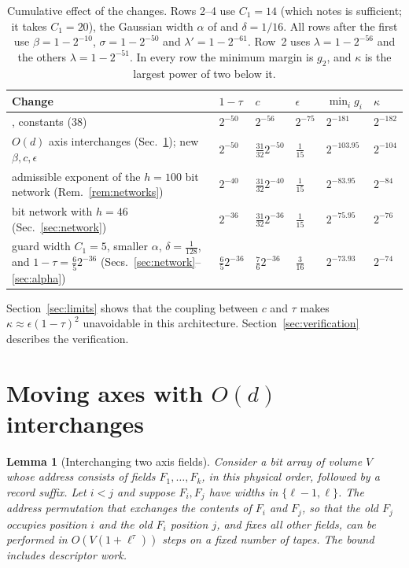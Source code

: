 \documentclass[11pt]{article}
\numberwithin{equation}{section}
\numberwithin{table}{section}
\newtheorem{lemma}[theorem]{Lemma}
\theoremstyle{remark}
\newcommand{\OAI}{\cite{OAI}}
\begin{document}
\begin{table}[ht]
\centering
\small
\renewcommand{\arraystretch}{1.3}
\begin{tabular}{@{}>{\raggedright\arraybackslash}p{.39\linewidth}lllll@{}}
\toprule
Change & $1-\tau$ & $c$ & $\epsilon$ & $\min_i g_i$ & $\kappa$\\
\midrule
\OAI, constants (38) & $2^{-50}$ & $2^{-56}$ & $2^{-75}$ & $2^{-181}$ & $2^{-182}$\\
$O(d)$ axis interchanges (Sec.~\ref{sec:axes}); new $\beta,c,\epsilon$
 & $2^{-50}$ & $\tfrac{31}{32}2^{-50}$ & $\tfrac1{15}$ & $2^{-103.95}$ & $2^{-104}$\\
admissible exponent of the $h=100$ bit network (Rem.~\ref{rem:networks}) & $2^{-40}$ & $\tfrac{31}{32}2^{-40}$ & $\tfrac1{15}$ & $2^{-83.95}$ & $2^{-84}$\\
bit network with $h=46$ (Sec.~\ref{sec:network})
 & $2^{-36}$ & $\tfrac{31}{32}2^{-36}$ & $\tfrac1{15}$ & $2^{-75.95}$ & $2^{-76}$\\
guard width $C_1=5$, smaller $\alpha$, $\delta=\tfrac1{128}$, and $1-\tau=\tfrac65 2^{-36}$ (Secs.~\ref{sec:network}--\ref{sec:alpha})
 & $\tfrac65 2^{-36}$ & $\tfrac76 2^{-36}$ & $\tfrac3{16}$ & $2^{-73.93}$ & $2^{-74}$\\
\bottomrule
\end{tabular}
\caption{Cumulative effect of the changes. Rows 2--4 use
$C_1=14$ (which \OAI{} notes is sufficient; it takes $C_1=20$), the Gaussian width
$\alpha$ of \OAI{} and $\delta=1/16$. All rows after the first use
$\beta=1-2^{-10}$, $\sigma=1-2^{-50}$ and $\lambda'=1-2^{-61}$. Row~2 uses
$\lambda=1-2^{-56}$ and the others $\lambda=1-2^{-51}$. In every row
the minimum margin is $g_2$, and $\kappa$ is the largest power of two
below it.}
\label{tab:ladder}
\end{table}

Section~\ref{sec:limits} shows that the coupling between $c$ and $\tau$
makes $\kappa\approx\epsilon(1-\tau)^2$ unavoidable in this
architecture. Section~\ref{sec:verification} describes the
verification.

\section{Moving axes with \texorpdfstring{$O(d)$}{O(d)} interchanges}
\label{sec:axes}

\begin{lemma}[Interchanging two axis fields]\label{lem:direct-swap}
Consider a bit array of volume $V$ whose address consists of fields
$F_1,\dots,F_k$, in this physical order, followed by a record suffix.
Let $i<j$ and suppose $F_i,F_j$ have widths in $\{\ell-1,\ell\}$. The
address permutation that exchanges the contents of $F_i$ and $F_j$, so
that the old $F_j$ occupies position $i$ and the old $F_i$ position $j$,
and fixes all other fields, can be performed in $O(V(1+\ell^\tau))$
steps on a fixed number of tapes. The bound includes descriptor work.
\end{lemma}
\end{document}
